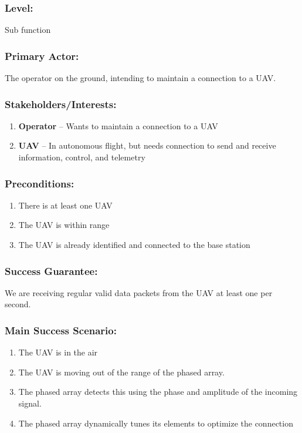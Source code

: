 \documentclass[ProductRequirements.tex]{subfiles}
\begin{document}
	\subsubsection*{Level:}
	Sub function
	\subsubsection*{Primary Actor:}
	The operator on the ground, intending to maintain a connection to a UAV.
	\subsubsection*{Stakeholders/Interests:}
	\begin{enumerate}\itemsep1pt
		\item \textbf{Operator} -- Wants to maintain a connection to a UAV
		\item \textbf{UAV} -- In autonomous flight, but needs connection to send and receive information, control, and telemetry
	\end{enumerate}
	\subsubsection*{Preconditions:}
	\begin{enumerate}\itemsep1pt
		\item There is at least one UAV
		\item The UAV is within range
		\item The UAV is already identified and connected to the base station
	\end{enumerate}
	\subsubsection*{Success Guarantee:}
	We are receiving regular valid data packets from the UAV at least one per second. 
	\subsubsection*{Main Success Scenario:}
	\begin{enumerate}\itemsep1pt
		\item The UAV is in the air
		\item The UAV is moving out of the range of the phased array.
		\item The phased array detects this using the phase and amplitude of the incoming signal.
		\item The phased array dynamically tunes its elements to optimize the connection 
	\end{enumerate}
\end{document}
